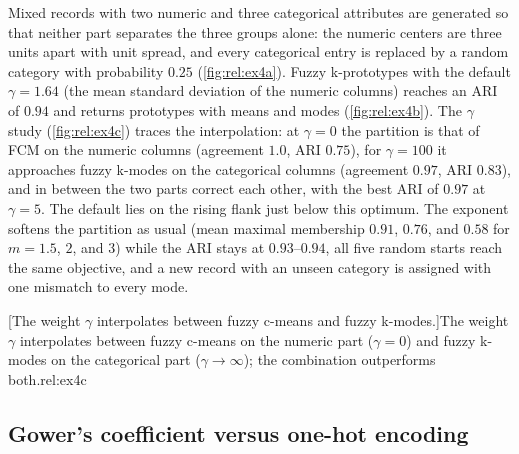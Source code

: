 Mixed records with two numeric and three categorical attributes are generated so that neither part separates the three groups alone: the numeric centers are three units apart with unit spread, and every categorical entry is replaced by a random category with probability $0.25$ (\cref{fig:rel:ex4a}). Fuzzy k-prototypes with the default $\gamma=1.64$ (the mean standard deviation of the numeric columns) reaches an ARI of $0.94$ and returns prototypes with means and modes (\cref{fig:rel:ex4b}). The $\gamma$ study (\cref{fig:rel:ex4c}) traces the interpolation: at $\gamma=0$ the partition is that of FCM on the numeric columns (agreement $1.0$, ARI $0.75$), for $\gamma=100$ it approaches fuzzy k-modes on the categorical columns (agreement $0.97$, ARI $0.83$), and in between the two parts correct each other, with the best ARI of $0.97$ at $\gamma=5$. The default lies on the rising flank just below this optimum. The exponent softens the partition as usual (mean maximal membership $0.91$, $0.76$, and $0.58$ for $m=1.5$, $2$, and $3$) while the ARI stays at $0.93$--$0.94$, all five random starts reach the same objective, and a new record with an unseen category is assigned with one mismatch to every mode.

[The weight $\gamma$ interpolates between fuzzy c-means and fuzzy k-modes.]{The weight $\gamma$ interpolates between fuzzy c-means on the numeric part ($\gamma=0$) and fuzzy k-modes on the categorical part ($\gamma\to\infty$); the combination outperforms both.}{rel:ex4c}

\subsection{Gower's coefficient versus one-hot encoding}

